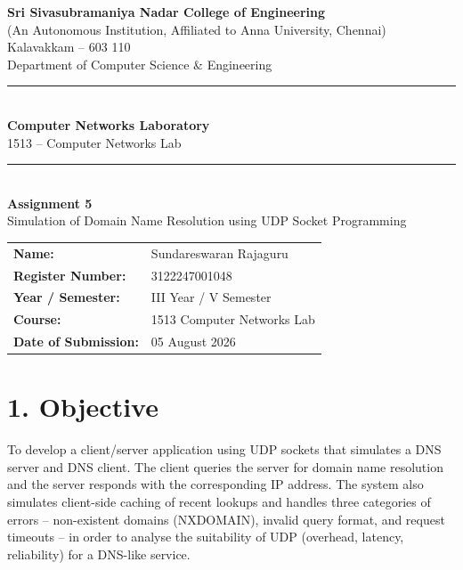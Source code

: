 \documentclass[11pt]{article}
\title{\vspace{-2cm}}
\date{}
\begin{document}
\begin{titlepage}
\centering
\vspace*{1cm}
{\large \textbf{Sri Sivasubramaniya Nadar College of Engineering}}\\
{\small (An Autonomous Institution, Affiliated to Anna University, Chennai)}\\
{\small Kalavakkam -- 603 110}\\[0.3cm]
{\small Department of Computer Science \& Engineering}\\[1.5cm]

\rule{\linewidth}{0.5mm}\\[0.4cm]
{\LARGE \textbf{Computer Networks Laboratory}}\\[0.3cm]
{\Large 1513 -- Computer Networks Lab}\\[0.4cm]
\rule{\linewidth}{0.5mm}\\[1.5cm]

{\huge \textbf{Assignment 5}}\\[0.4cm]
{\Large Simulation of Domain Name Resolution using UDP Socket Programming}\\[2cm]

\begin{center}
\begin{tabular}{ll}
\textbf{Name:} & Sundareswaran Rajaguru \\[0.2cm]
\textbf{Register Number:} & 3122247001048 \\[0.2cm]
\textbf{Year / Semester:} & III Year / V Semester \\[0.2cm]
\textbf{Course:} & 1513 Computer Networks Lab \\[0.2cm]
\textbf{Date of Submission:} & 05 August 2026 \\[0.2cm]
\end{tabular}
\end{center}

\vfill
\end{titlepage}

\section*{1. Objective}
To develop a client/server application using UDP sockets that simulates a DNS server and DNS
client. The client queries the server for domain name resolution and the server responds with
the corresponding IP address. The system also simulates client-side caching of recent lookups
and handles three categories of errors -- non-existent domains (NXDOMAIN), invalid query
format, and request timeouts -- in order to analyse the suitability of UDP (overhead, latency,
reliability) for a DNS-like service.
\end{document}
